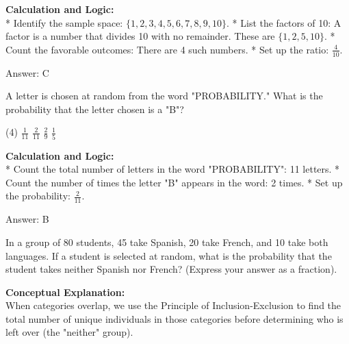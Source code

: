 \documentclass[11pt,paper=a4,answers]{exam}
\begin{document}
\begin{questions}
\begin{solution}
\textbf{Calculation and Logic:} \\
* Identify the sample space: $\{1, 2, 3, 4, 5, 6, 7, 8, 9, 10\}$.
* List the factors of 10: A factor is a number that divides 10 with no remainder. These are $\{1, 2, 5, 10\}$.
* Count the favorable outcomes: There are 4 such numbers.
* Set up the ratio: $\frac{4}{10}$.

\vspace{30pt}

Answer: \colorbox{yellow!100}{C}
\end{solution}

\vspace{60pt}

\question
A letter is chosen at random from the word "PROBABILITY." What is the probability that the letter chosen is a "B"?
\begin{tasks}(4)
    \task $\frac{1}{11}$
    \task $\frac{2}{11}$
    \task $\frac{2}{9}$
    \task $\frac{1}{5}$
\end{tasks}

\begin{solution}
\textbf{Calculation and Logic:} \\
* Count the total number of letters in the word "PROBABILITY": 11 letters.
* Count the number of times the letter "B" appears in the word: 2 times.
* Set up the probability: $\frac{2}{11}$.

\vspace{30pt}

Answer: \colorbox{yellow!100}{B}
\end{solution}

\vspace{60pt}

\question
In a group of 80 students, 45 take Spanish, 20 take French, and 10 take both languages. If a student is selected at random, what is the probability that the student takes neither Spanish nor French? (Express your answer as a fraction).

\begin{solution}
\textbf{Conceptual Explanation:} \\
When categories overlap, we use the Principle of Inclusion-Exclusion to find the total number of unique individuals in those categories before determining who is left over (the "neither" group).

\vspace{30pt}


\end{solution}
\end{questions}
\end{document}
